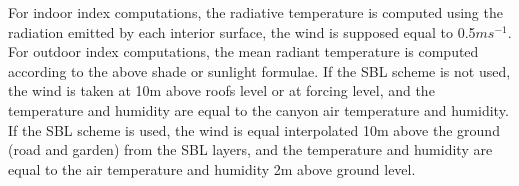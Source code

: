 For indoor index computations, the radiative temperature is computed using the radiation emitted by each interior surface, the wind is supposed equal to 0.5$ms^{-1}$. \\

For outdoor index computations, the mean radiant temperature is computed according to the above shade or sunlight formulae. If the SBL scheme is not used, the wind is taken at 10m above roofs level or at forcing level, and the temperature and humidity are equal to the canyon air temperature and humidity. If the SBL scheme is used, the wind is equal interpolated 10m above the ground (road and garden) from the SBL layers, and the temperature and humidity are equal to the air temperature and humidity 2m above ground level. \\




\clearpage

